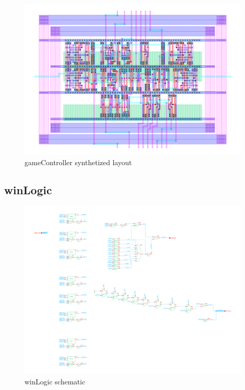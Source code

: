 \documentclass[]{article}
\begin{document}
\begin{figure}[H]
\centering
\includegraphics[width=.9\textwidth]{gameController-layout}
\caption{gameController synthetized layout}
\label{fig:gameController-layout}
\end{figure}

\subsection{winLogic}
\begin{figure}[H]
\centering
\includegraphics[width=.9\textwidth]{winLogic-schematic}
\caption{winLogic schematic}
\label{fig:winLogic-schematic}
\end{figure}
\end{document}
